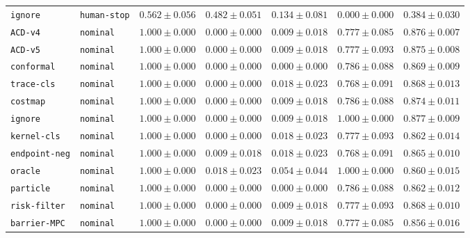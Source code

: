 \documentclass{article}
\begin{document}
\begin{center}
{\begin{tabular}{llccccc}
\texttt{ignore} & \texttt{human-stop} & $0.562 \pm 0.056$ & $0.482 \pm 0.051$ & $0.134 \pm 0.081$ & $0.000 \pm 0.000$ & $0.384 \pm 0.030$ \\
\texttt{ACD-v4} & \texttt{nominal} & $1.000 \pm 0.000$ & $0.000 \pm 0.000$ & $0.009 \pm 0.018$ & $0.777 \pm 0.085$ & $0.876 \pm 0.007$ \\
\texttt{ACD-v5} & \texttt{nominal} & $1.000 \pm 0.000$ & $0.000 \pm 0.000$ & $0.009 \pm 0.018$ & $0.777 \pm 0.093$ & $0.875 \pm 0.008$ \\
\texttt{conformal} & \texttt{nominal} & $1.000 \pm 0.000$ & $0.000 \pm 0.000$ & $0.000 \pm 0.000$ & $0.786 \pm 0.088$ & $0.869 \pm 0.009$ \\
\texttt{trace-cls} & \texttt{nominal} & $1.000 \pm 0.000$ & $0.000 \pm 0.000$ & $0.018 \pm 0.023$ & $0.768 \pm 0.091$ & $0.868 \pm 0.013$ \\
\texttt{costmap} & \texttt{nominal} & $1.000 \pm 0.000$ & $0.000 \pm 0.000$ & $0.009 \pm 0.018$ & $0.786 \pm 0.088$ & $0.874 \pm 0.011$ \\
\texttt{ignore} & \texttt{nominal} & $1.000 \pm 0.000$ & $0.000 \pm 0.000$ & $0.009 \pm 0.018$ & $1.000 \pm 0.000$ & $0.877 \pm 0.009$ \\
\texttt{kernel-cls} & \texttt{nominal} & $1.000 \pm 0.000$ & $0.000 \pm 0.000$ & $0.018 \pm 0.023$ & $0.777 \pm 0.093$ & $0.862 \pm 0.014$ \\
\texttt{endpoint-neg} & \texttt{nominal} & $1.000 \pm 0.000$ & $0.009 \pm 0.018$ & $0.018 \pm 0.023$ & $0.768 \pm 0.091$ & $0.865 \pm 0.010$ \\
\texttt{oracle} & \texttt{nominal} & $1.000 \pm 0.000$ & $0.018 \pm 0.023$ & $0.054 \pm 0.044$ & $1.000 \pm 0.000$ & $0.860 \pm 0.015$ \\
\texttt{particle} & \texttt{nominal} & $1.000 \pm 0.000$ & $0.000 \pm 0.000$ & $0.000 \pm 0.000$ & $0.786 \pm 0.088$ & $0.862 \pm 0.012$ \\
\texttt{risk-filter} & \texttt{nominal} & $1.000 \pm 0.000$ & $0.000 \pm 0.000$ & $0.009 \pm 0.018$ & $0.777 \pm 0.093$ & $0.868 \pm 0.010$ \\
\texttt{barrier-MPC} & \texttt{nominal} & $1.000 \pm 0.000$ & $0.000 \pm 0.000$ & $0.009 \pm 0.018$ & $0.777 \pm 0.085$ & $0.856 \pm 0.016$ \\
\bottomrule
\end{tabular}%
}
\end{center}
\normalsize
\end{document}
